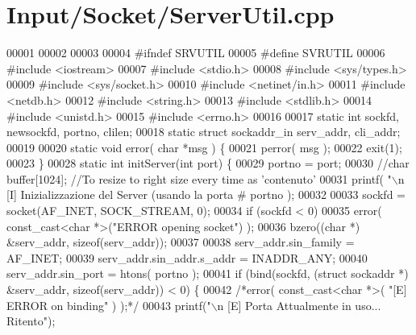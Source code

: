 \hypertarget{ServerUtil_8cpp_source}{\section{\-Input/\-Socket/\-Server\-Util.cpp}
}

\begin{DoxyCode}
00001 
00002 
00003 
00004 \textcolor{preprocessor}{#ifndef SRVUTIL}
00005 \textcolor{preprocessor}{}\textcolor{preprocessor}{#define SVRUTIL}
00006 \textcolor{preprocessor}{}\textcolor{preprocessor}{#include <iostream>}
00007 \textcolor{preprocessor}{#include <stdio.h>}
00008 \textcolor{preprocessor}{#include <sys/types.h>}
00009 \textcolor{preprocessor}{#include <sys/socket.h>}
00010 \textcolor{preprocessor}{#include <netinet/in.h>}
00011 \textcolor{preprocessor}{#include <netdb.h>}
00012 \textcolor{preprocessor}{#include <string.h>}
00013 \textcolor{preprocessor}{#include <stdlib.h>}
00014 \textcolor{preprocessor}{#include <unistd.h>}
00015 \textcolor{preprocessor}{#include <errno.h>}
00016 
00017 \textcolor{keyword}{static} \textcolor{keywordtype}{int} sockfd, newsockfd, portno, clilen;
00018 \textcolor{keyword}{static} \textcolor{keyword}{struct }sockaddr\_in serv\_addr, cli\_addr;
00019 
00020 \textcolor{keyword}{static} \textcolor{keywordtype}{void} error( \textcolor{keywordtype}{char} *msg ) \{
00021   perror(  msg );
00022   exit(1);
00023 \}
00028 \textcolor{keyword}{static} \textcolor{keywordtype}{int} initServer(\textcolor{keywordtype}{int} port) \{
00029      portno = port;
00030      \textcolor{comment}{//char buffer[1024]; //To resize to right size every time as 'contenuto'}
00031      printf( \textcolor{stringliteral}{"\(\backslash\)n [I] Inizializzazione del Server (usando la porta #%
      portno );
00032 
00033      sockfd = socket(AF\_INET, SOCK\_STREAM, 0);
00034      \textcolor{keywordflow}{if} (sockfd < 0)
00035          error( const\_cast<char *>(\textcolor{stringliteral}{"ERROR opening socket"}) );
00036      bzero((\textcolor{keywordtype}{char} *) &serv\_addr, \textcolor{keyword}{sizeof}(serv\_addr));
00037 
00038      serv\_addr.sin\_family = AF\_INET;
00039      serv\_addr.sin\_addr.s\_addr = INADDR\_ANY;
00040      serv\_addr.sin\_port = htons( portno );
00041      \textcolor{keywordflow}{if} (bind(sockfd, (\textcolor{keyword}{struct} sockaddr *) &serv\_addr, \textcolor{keyword}{sizeof}(serv\_addr)) < 0) \{
00042        \textcolor{comment}{/*error( const\_cast<char *>( "[E] ERROR on binding" ) );*/}
00043                  printf(\textcolor{stringliteral}{"\(\backslash\)n [E] Porta Attualmente in uso... Ritento"});
}
\end{DoxyCode}
